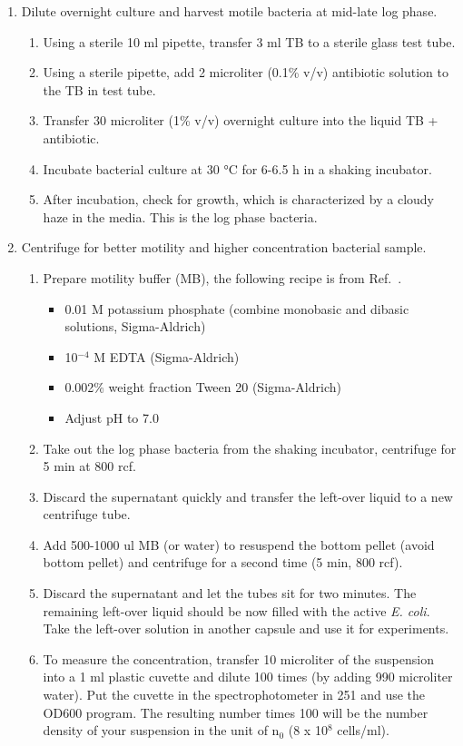 \begin{enumerate}
  \item Dilute overnight culture and harvest motile bacteria at mid-late log phase.
  \begin{enumerate}
    \item Using a sterile 10 ml pipette, transfer 3 ml TB to a sterile glass test tube.
    \item Using a sterile pipette, add 2 microliter (0.1\% v/v) antibiotic solution to the TB in test tube.
    \item Transfer 30 microliter (1\% v/v) overnight culture into the liquid TB + antibiotic.
    \item Incubate bacterial culture at 30 °C for 6-6.5 h in a shaking incubator.
    \item After incubation, check for growth, which is characterized by a cloudy haze in the media. This is the log phase bacteria.
  \end{enumerate}
  \item Centrifuge for better motility and higher concentration bacterial sample.
  \begin{enumerate}
    \item Prepare motility buffer (MB), the following recipe is from Ref.~\cite{Peng2016}.
    \begin{itemize}
      \item 0.01 M potassium phosphate (combine monobasic and dibasic solutions, Sigma-Aldrich)
      \item 10$^{-4}$ M EDTA (Sigma-Aldrich)
      \item 0.002\% weight fraction Tween 20 (Sigma-Aldrich)
      \item Adjust pH to 7.0
    \end{itemize}
    \item Take out the log phase bacteria from the shaking incubator, centrifuge for 5 min at 800 rcf.
    \item Discard the supernatant quickly and transfer the left-over liquid to a new centrifuge tube.
    \item Add 500-1000 ul MB (or water) to resuspend the bottom pellet (avoid bottom pellet) and centrifuge for a second time (5 min, 800 rcf).
    \item Discard the supernatant and let the tubes sit for two minutes. The remaining left-over liquid should be now filled with the active \textit{E. coli}. Take the left-over solution in another capsule and use it for experiments.
    \item To measure the concentration, transfer 10 microliter of the suspension into a 1 ml plastic cuvette and dilute 100 times (by adding 990 microliter water). Put the cuvette in the spectrophotometer in 251 and use the OD600 program. The resulting number times 100 will be the number density of your suspension in the unit of n$_0$ (8 x 10$^8$ cells/ml).
  \end{enumerate}


\end{enumerate}
